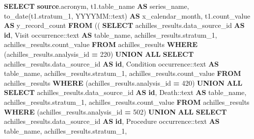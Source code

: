 \documentclass[
]{book}
\newenvironment{Shaded}{\begin{snugshade}}{\end{snugshade}}
\newcommand{\CharTok}[1]{\textcolor[rgb]{0.31,0.60,0.02}{#1}}
\newcommand{\DecValTok}[1]{\textcolor[rgb]{0.00,0.00,0.81}{#1}}
\newcommand{\FunctionTok}[1]{\textcolor[rgb]{0.00,0.00,0.00}{#1}}
\newcommand{\KeywordTok}[1]{\textcolor[rgb]{0.13,0.29,0.53}{\textbf{#1}}}
\newcommand{\NormalTok}[1]{#1}
\newcommand{\OperatorTok}[1]{\textcolor[rgb]{0.81,0.36,0.00}{\textbf{#1}}}
\newcommand{\StringTok}[1]{\textcolor[rgb]{0.31,0.60,0.02}{#1}}
\begin{document}
\begin{Shaded}
\begin{Highlighting}[]
\KeywordTok{SELECT} \KeywordTok{source}\NormalTok{.acronym,}
\NormalTok{   t1.table\_name }\KeywordTok{AS}\NormalTok{ series\_name,}
   \FunctionTok{to\_date}\NormalTok{(t1.stratum\_1, }\StringTok{\textquotesingle{}YYYYMM\textquotesingle{}}\NormalTok{:}\CharTok{:text}\NormalTok{) }\KeywordTok{AS}\NormalTok{ x\_calendar\_month,}
\NormalTok{   t1.count\_value }\KeywordTok{AS}\NormalTok{ y\_record\_count}
  \KeywordTok{FROM}\NormalTok{ (( }\KeywordTok{SELECT}\NormalTok{ achilles\_results.data\_source\_id }\KeywordTok{AS} \KeywordTok{id}\NormalTok{,}
           \StringTok{\textquotesingle{}Visit occurrence\textquotesingle{}}\NormalTok{:}\CharTok{:text} \KeywordTok{AS}\NormalTok{ table\_name,}
\NormalTok{           achilles\_results.stratum\_1,}
\NormalTok{           achilles\_results.count\_value}
          \KeywordTok{FROM}\NormalTok{ achilles\_results}
         \KeywordTok{WHERE}\NormalTok{ (achilles\_results.analysis\_id }\OperatorTok{=} \DecValTok{220}\NormalTok{)}
       \KeywordTok{UNION} \KeywordTok{ALL}
        \KeywordTok{SELECT}\NormalTok{ achilles\_results.data\_source\_id }\KeywordTok{AS} \KeywordTok{id}\NormalTok{,}
           \StringTok{\textquotesingle{}Condition occurrence\textquotesingle{}}\NormalTok{:}\CharTok{:text} \KeywordTok{AS}\NormalTok{ table\_name,}
\NormalTok{           achilles\_results.stratum\_1,}
\NormalTok{           achilles\_results.count\_value}
          \KeywordTok{FROM}\NormalTok{ achilles\_results}
         \KeywordTok{WHERE}\NormalTok{ (achilles\_results.analysis\_id }\OperatorTok{=} \DecValTok{420}\NormalTok{)}
       \KeywordTok{UNION} \KeywordTok{ALL}
        \KeywordTok{SELECT}\NormalTok{ achilles\_results.data\_source\_id }\KeywordTok{AS} \KeywordTok{id}\NormalTok{,}
           \StringTok{\textquotesingle{}Death\textquotesingle{}}\NormalTok{:}\CharTok{:text} \KeywordTok{AS}\NormalTok{ table\_name,}
\NormalTok{           achilles\_results.stratum\_1,}
\NormalTok{           achilles\_results.count\_value}
          \KeywordTok{FROM}\NormalTok{ achilles\_results}
         \KeywordTok{WHERE}\NormalTok{ (achilles\_results.analysis\_id }\OperatorTok{=} \DecValTok{502}\NormalTok{)}
       \KeywordTok{UNION} \KeywordTok{ALL}
        \KeywordTok{SELECT}\NormalTok{ achilles\_results.data\_source\_id }\KeywordTok{AS} \KeywordTok{id}\NormalTok{,}
           \StringTok{\textquotesingle{}Procedure occurrence\textquotesingle{}}\NormalTok{:}\CharTok{:text} \KeywordTok{AS}\NormalTok{ table\_name,}
\NormalTok{           achilles\_results.stratum\_1,}

\end{Highlighting}
\end{Shaded}
\end{document}
